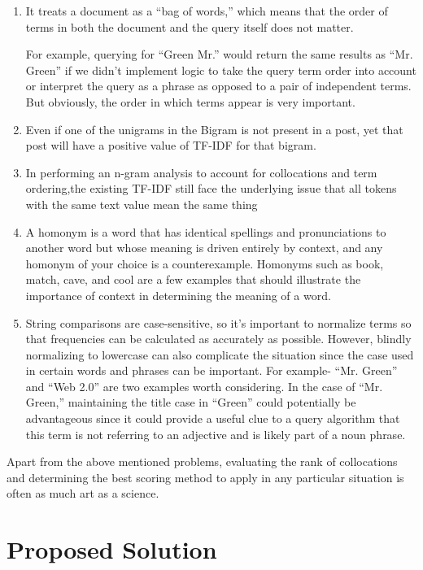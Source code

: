 \documentclass{mnnit}
\begin{document}
\begin{enumerate}
\item  It treats a document as a “bag of words,” which means that the order of terms in both the document and the query
itself does not matter.

For example, querying for “Green Mr.” would return the same
results as “Mr. Green” if we didn’t implement logic to take the query term order into
account or interpret the query as a phrase as opposed to a pair of independent terms.
But obviously, the order in which terms appear is very important.
\item Even if one of the unigrams in the Bigram is not present in a post, yet that post will have a positive value of TF-IDF for that bigram.

\item  In performing an n-gram analysis to account for collocations and term ordering,the existing TF-IDF still face the underlying issue that  all tokens with the same text value mean the same thing

\item A homonym is a word that has identical spellings and pronunciations to another word but whose meaning is driven entirely by context, and any homonym of your choice is a counterexample. Homonyms such as book, match, cave, and cool are a few examples that should illustrate the importance of context in determining the meaning of a word.
 
\item String comparisons are case-sensitive, so it’s important to normalize terms so that frequencies can be calculated as accurately as possible. However, blindly normalizing to lowercase can also complicate the situation since the case used in certain words and phrases can be important.
For example-
“Mr. Green” and “Web 2.0” are two examples worth considering. In the case of “Mr.
Green,” maintaining the title case in “Green” could potentially be advantageous
since it could provide a useful clue to a query algorithm that this term is not referring
to an adjective and is likely part of a noun phrase.

\end{enumerate}


\noindent Apart from the above mentioned problems, evaluating the rank of collocations and determining the best scoring method to apply in any particular situation is often as much art as a science.


\section{Proposed Solution }
\end{document}
